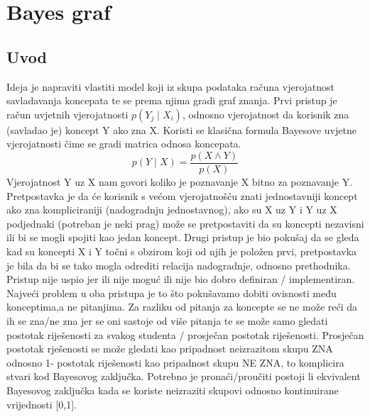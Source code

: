 \documentclass[times, utf8,projekt]{fer}
\begin{document}
\chapter{Bayes graf}
	\section{Uvod}
	
	Ideja je napraviti vlastiti model koji iz skupa podataka računa vjerojatnost savladavanja koncepata te se prema njima gradi graf znanja.\newline
	Prvi pristup je račun uvjetnih vjerojatnosti $p(Y_j\mid X_i)$, odnosno vjerojatnost da korisnik zna (savladao je) koncept Y ako zna X. Koristi se klasična formula Bayesove uvjetne vjerojatnosti čime se gradi matrica odnosa koncepata.
	\begin{equation}
		p(Y \mid X)=\frac{p(X \wedge Y)}{p(X)}
	\end{equation}
	\newline Vjerojatnost Y uz X nam govori koliko je poznavanje X bitno za poznavanje Y. Pretpostavka je da će korisnik s većom vjerojatnošću znati jednostavniji koncept ako zna kompliciraniji (nadogradnju jednostavnog), ako su X uz Y i Y uz X podjednaki (potreban je neki prag) može se pretpostaviti da su koncepti nezavisni ili bi se mogli spojiti kao jedan koncept. \newline
	Drugi pristup je bio pokušaj da se gleda kad su koncepti X i Y točni s obzirom koji od njih je položen prvi, pretpostavka je bila da bi se tako mogla odrediti relacija nadogradnje, odnosno prethodnika. Pristup nije uspio jer ili nije moguć ili nije bio dobro definiran / implementiran.\newline
	Najveći problem u oba pristupa je to što pokušavamo dobiti ovisnosti među konceptima,a ne pitanjima. Za razliku od pitanja za koncepte se ne može reći da ih se zna/ne zna jer se oni sastoje od više pitanja te se može samo gledati postotak riješenosti za svakog studenta / prosječan postotak riješenosti. Prosječan postotak rješenosti se može gledati kao pripadnost neizrazitom skupu ZNA odnosno 1- postotak riješenosti kao pripadnost skupu NE ZNA, to komplicira stvari kod Bayesovog zaključka. Potrebno je pronaći/proučiti postoji li ekvivalent Bayesovog zaključka kada se koriste neizraziti skupovi odnosno kontinuirane vrijednosti [0,1].
	
\end{document}
